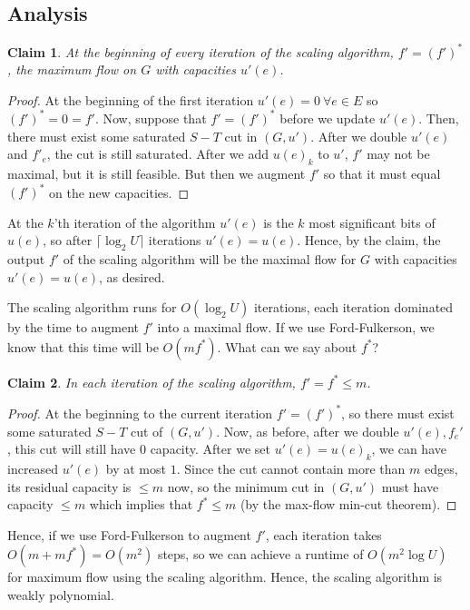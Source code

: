 \documentclass[11pt]{article}
\newtheorem*{claim}{Claim}
\begin{document}
\subsection{Analysis}
\begin{claim}
At the beginning of every iteration of the scaling algorithm, $f' = (f')^*$, the maximum flow on $G$ with capacities $u'(e)$. 
\end{claim}
\begin{proof}
At the beginning of the first iteration $u'(e) = 0  ~ \forall e \in E$ so $(f')^* = 0 = f'$. Now, suppose that $f' = (f')^*$ before we update $u'(e)$. Then, there must exist some saturated $S-T$ cut in $(G, u')$. After we double $u'(e)$ and $f'_e$, the cut is still saturated. After we add $u(e)_k$ to $u'$, $f'$ may not be maximal, but it is still feasible. But then we augment $f'$ so that it must equal $(f')^*$ on the new capacities. 
\end{proof}

At the $k$'th iteration of the algorithm $u'(e)$ is the $k$ most significant bits of $u(e)$, so after $\lceil \log_2 U \rceil $ iterations $u'(e) = u(e)$. Hence, by the claim, the output $f'$ of the scaling algorithm will be the maximal flow for $G$ with capacities $u'(e) = u(e)$, as desired. 

The scaling algorithm runs for $O(\log_2 U)$ iterations, each iteration dominated by the time to augment $f'$ into a maximal flow. If we use Ford-Fulkerson, we know that this time will be $O(m f^*)$. What can we say about $f^*$? 

\begin{claim}
In each iteration of the scaling algorithm, $f' = f^* \leq m$. 
\end{claim}

\begin{proof}
At the beginning to the current iteration $f' = (f')^*$, so there must exist some saturated $S-T$ cut of $(G, u')$. Now, as before, after we double $u'(e), f_e'$, this cut will still have 0 capacity. After we set $u'(e) = u(e)_k$, we can have increased $u'(e)$ by at most $1$. Since the cut cannot contain more than $m$ edges, its residual capacity is $\leq m$ now, so the minimum cut in $(G, u')$ must have capacity $\leq m$ which implies that $f^* \leq m$ (by the max-flow min-cut theorem). 
\end{proof}

Hence, if we use Ford-Fulkerson to augment $f'$, each iteration takes $O(m + m f^*) = O(m^2)$ steps, so we can achieve a runtime of $O(m^2\log U)$ for maximum flow using the scaling algorithm. Hence, the scaling algorithm is weakly polynomial. 
\end{document}
